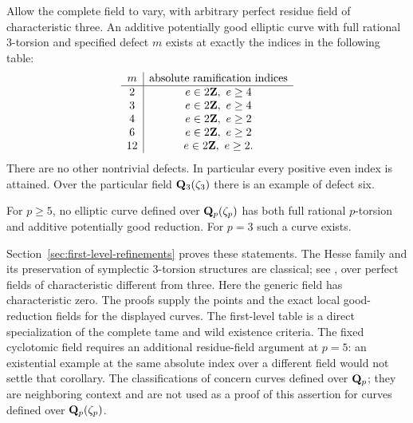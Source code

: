 \begin{corollary}\label{cor:three-first-level-table}
Allow the complete field to vary, with arbitrary perfect residue field of characteristic three. An additive potentially good elliptic curve with full rational $3$-torsion and specified defect $m$ exists at exactly the indices in the following table:
\[
\begin{array}{c|c}
 m&\text{absolute ramification indices}\\\hline
 2&e\in2\mathbf Z,\ e\ge4\\
 3&e\in2\mathbf Z,\ e\ge4\\
 4&e\in2\mathbf Z,\ e\ge2\\
 6&e\in2\mathbf Z,\ e\ge2\\
 12&e\in2\mathbf Z,\ e\ge2.
\end{array}
\]
There are no other nontrivial defects. In particular every positive even index is attained. Over the particular field $\mathbf Q_3(\zeta_3)$ there is an example of defect six.
\end{corollary}

\begin{corollary}\label{cor:cyclotomic-full-p}
For $p\ge5$, no elliptic curve defined over $\mathbf Q_p(\zeta_p)$ has both full rational $p$-torsion and additive potentially good reduction. For $p=3$ such a curve exists.
\end{corollary}

Section~\ref{sec:first-level-refinements} proves these statements. The Hesse family and its preservation of symplectic $3$-torsion structures are classical; see \citet[\S1, Theorem~1.1, p.~2]{AnemaTopTuijp2018}, over perfect fields of characteristic different from three. Here the generic field has characteristic zero. The proofs supply the points and the exact local good-reduction fields for the displayed curves. The first-level table is a direct specialization of the complete tame and wild existence criteria. The fixed cyclotomic field requires an additional residue-field argument at $p=5$: an existential example at the same absolute index over a different field would not settle that corollary. The classifications of \citet{OzekiYoshida2026} concern curves defined over $\mathbf Q_p$; they are neighboring context and are not used as a proof of this assertion for curves defined over $\mathbf Q_p(\zeta_p)$.
